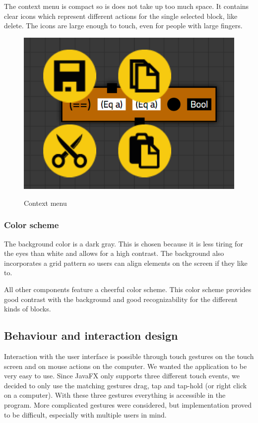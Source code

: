 The context menu is compact so is does not take up too much space. 
It contains clear icons which represent different actions for the single selected block, like delete.
The icons are large enough to touch, even for people with large fingers.

\begin{figure}[p]
	\centering
	\includegraphics[scale=0.5]{Images/blocks-menu}
	\label{fig:blocks-menu}
	\caption{Context menu}
\end{figure}

\subsubsection{Color scheme}

The background color is a dark gray.
This is chosen because it is less tiring for the eyes than white and allows for a high contrast.
The background also incorporates a grid pattern so users can align elements on the screen if they like to.

All other components feature a cheerful color scheme.
This color scheme provides good contrast with the background and good recognizability for the different kinds of blocks.

\subsection{Behaviour and interaction design}

Interaction with the user interface is possible through touch gestures on the touch screen and on mouse actions on the computer.
We wanted the application to be very easy to use.
Since JavaFX only supports three different touch events, we decided to only use the matching gestures drag, tap and tap-hold (or right click on a computer).
With these three gestures everything is accessible in the program.
More complicated gestures were considered, but implementation proved to be difficult, especially with multiple users in mind.

